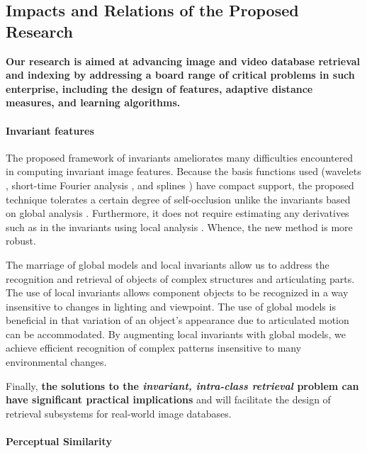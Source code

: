 \vspace*{-3ex}
\subsection{Impacts and Relations of the Proposed Research}
\label{impact}
\vspace*{-1ex}

{\bf Our research is aimed at advancing image and video database
retrieval and indexing by addressing a board range of critical problems 
in such enterprise, including the design of features, adaptive 
distance measures, and learning algorithms.} 

\paragraph{Invariant features}
The proposed framework of invariants ameliorates many difficulties
encountered in computing invariant image features. Because the
basis functions used (wavelets \cite{Daubechies88,Mallat89a},
short-time Fourier analysis \cite{Gabor46,Rabiner78}, and splines
\cite{Farin83,Rogers90}) have compact support, the proposed technique
tolerates a certain degree of self-occlusion unlike the invariants based on
global analysis \cite{Hu61,Teh88}.  Furthermore, it does not require
estimating any derivatives such as in the invariants using local analysis
\cite{Rivlin95,Weiss93b}.  Whence, the new method is more robust.  

The marriage of global models and local invariants allow us to
address the recognition and retrieval of objects of complex structures
and articulating parts. The use of local invariants allows component
objects to be recognized in a way insensitive to changes in lighting
and viewpoint.  The use of global models is beneficial in that
variation of an object's appearance due to articulated motion can be
accommodated.  By augmenting local invariants with global models, we
achieve efficient recognition of complex patterns insensitive to many
environmental changes.

Finally, {\bf the solutions to the {\em invariant, intra-class retrieval}
problem can have significant practical
implications} and will facilitate the design of retrieval subsystems
for real-world image databases.

\paragraph{Perceptual Similarity}
\label{sec-related-dpf}

